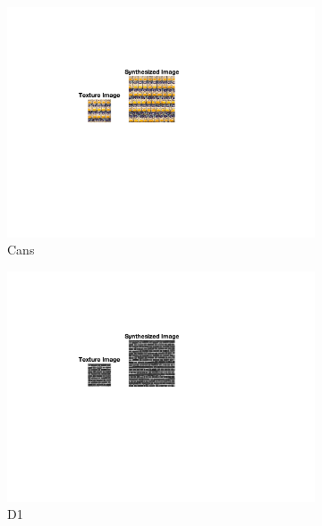 \documentclass[10pt,twocolumn,letterpaper]{article}
\begin{document}
\begin{figure}
    \hfill
    \begin{subfigure}[h]{0.33\textwidth}
        \centering
        \includegraphics[trim={4.5cm 7cm 8.0cm 3cm}, clip, scale=1.5, width=\textwidth]{../results/syn_final/result_cans_B_40.png}
        \caption{Cans}
        \label{fig:cans_res}
    \end{subfigure}
    \begin{subfigure}[h]{0.33\textwidth}
        \centering
        \includegraphics[trim={4.5cm 7cm 8.0cm 3cm}, clip, scale=1.5, width=\textwidth]{../results/syn_final/result_brick_bw_B_40.png}
        \caption{D1}
        \label{fig:d1_res}
    \end{subfigure}
    \hfill
    \begin{subfigure}[h]{0.33\textwidth}

\end{subfigure}
\end{figure}
\end{document}
